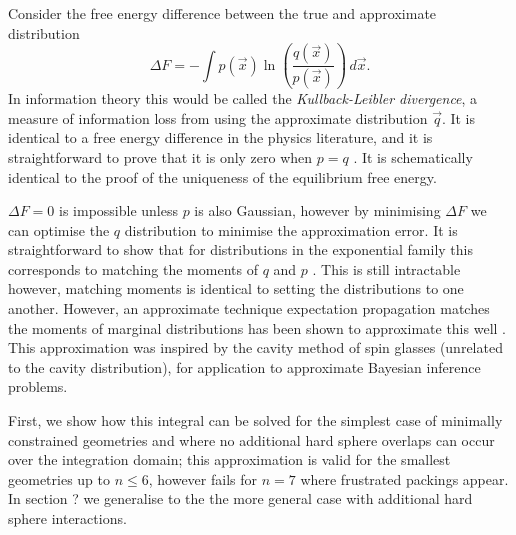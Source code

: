 \documentclass[11pt,twoside]{report}
\begin{document}
Consider the free energy difference between the true and approximate distribution
\begin{equation}
  \Delta F
  =
  - \int p(\vec{x})
  \ln{\left( \frac{q(\vec{x})}{p(\vec{x})} \right)} \, d\vec{x}.
\end{equation}
In information theory this would be called the \emph{Kullback-Leibler divergence}, a measure of information loss from using the approximate distribution $\vec{q}$.
It is identical to a free energy difference in the physics literature, and it is straightforward to prove that it is only zero when $p = q$ \cite{MerminPR1965, EvansAP1979}.
It is schematically identical to the proof of the uniqueness of the equilibrium free energy.

$\Delta F = 0$ is impossible unless $p$ is also Gaussian, however by minimising $\Delta F$ we can optimise the $q$ distribution to minimise the approximation error.
It is straightforward to show that for distributions in the exponential family this corresponds to matching the moments of $q$ and $p$ \cite{Minka2001,MinkaUAI2001,Rasmussen2006,Cunningham2011}.
This is still intractable however, matching moments is identical to setting the distributions to one another.
However, an approximate technique expectation propagation matches the moments of marginal distributions has been shown to approximate this well \cite{Minka2001,MinkaUAI2001,Rasmussen2006,Cunningham2011}.
This approximation was inspired by the cavity method of spin glasses (unrelated to the cavity distribution), for application to approximate Bayesian inference problems.

First, we show how this integral can be solved for the simplest case of minimally constrained geometries and where no additional hard sphere overlaps can occur over the integration domain; this approximation is valid for the smallest geometries up to $n \le 6$, however fails for $n=7$ where frustrated packings appear.
In section ? we generalise to the the more general case with additional hard sphere interactions.


\end{document}
